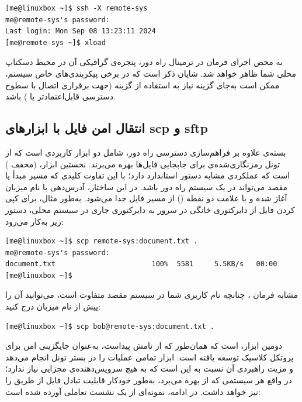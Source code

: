 \begin{latin}
\begin{lstlisting}
[me@linuxbox ~]$ ssh -X remote-sys
me@remote-sys's password:
Last login: Mon Sep 08 13:23:11 2024
[me@remote-sys ~]$ xload
\end{lstlisting}
\end{latin}

به محض اجرای فرمان  در ترمینال راه دور، پنجره‌ی گرافیکی آن در محیط دسکتاپ محلی شما ظاهر خواهد شد. شایان ذکر است که در برخی پیکربندی‌های خاص سیستم، ممکن است به‌جای گزینه  نیاز به استفاده از گزینه  (جهت برقراری اتصال با سطوح دسترسی قابل‌اعتمادتر یا ) باشد.

\subsection{انتقال امن فایل با ابزارهای scp و sftp}

بسته‌ی  علاوه بر فراهم‌سازی دسترسی راه دور، شامل دو ابزار کاربردی است که از تونل رمزنگاری‌شده‌ی  برای جابجایی فایل‌ها بهره می‌برند. نخستین ابزار،  (مخفف ) است که عملکردی مشابه دستور استاندارد  دارد؛ با این تفاوت کلیدی که مسیر مبدأ یا مقصد می‌تواند در یک سیستم راه دور باشد. در این ساختار، آدرس‌دهی با نام میزبان آغاز شده و با علامت دو نقطه (\cmd{:}) از مسیر فایل جدا می‌شود. به‌طور مثال، برای کپی کردن فایل  از دایرکتوری خانگی در سرور  به دایرکتوری جاری در سیستم محلی، دستور زیر به‌کار می‌رود:

\begin{latin}
\begin{lstlisting}
[me@linuxbox ~]$ scp remote-sys:document.txt .
me@remote-sys's password:
document.txt                       100%  5581     5.5KB/s   00:00
[me@linuxbox ~]$
\end{lstlisting}
\end{latin}

مشابه فرمان ، چنانچه نام کاربری شما در سیستم مقصد متفاوت است، می‌توانید آن را پیش از نام میزبان درج کنید:

\begin{latin}
\begin{lstlisting}
[me@linuxbox ~]$ scp bob@remote-sys:document.txt .
\end{lstlisting}
\end{latin}

دومین ابزار،  است که همان‌طور که از نامش پیداست، به‌عنوان جایگزینی امن برای پروتکل کلاسیک  توسعه یافته است. ابزار  تمامی عملیات را در بستر تونل  انجام می‌دهد و مزیت راهبردی آن نسبت به  این است که به هیچ سرویس‌دهنده‌ی مجزایی نیاز ندارد؛ در واقع هر سیستمی که از  بهره می‌برد، به‌طور خودکار قابلیت تبادل فایل از طریق  را نیز خواهد داشت. در ادامه، نمونه‌ای از یک نشست تعاملی  آورده شده است:

